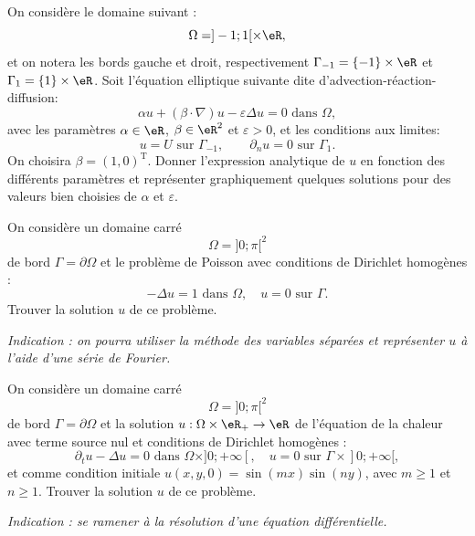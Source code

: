 
\newpage

\begin{exercice}\label{exoChEDP_AdvectionReactionDiffusion}

On considère le domaine suivant :
\[
\Omega = ]-1;1[ \times \eR,
\]
et on notera les bords gauche et droit, respectivement $\Gamma_{-1} = \{ -1 \} \times \eR$ et $\Gamma_1 = \{ 1 \} \times \eR$.
Soit l'équation elliptique suivante dite d'advection-réaction-diffusion:
\[
\alpha u + ( \beta \cdot \nabla ) u - \varepsilon \Delta u = 0 \mbox{ dans } \Omega,
\]
avec les paramètres $\alpha \in \eR$, $\beta \in \eR^2$ et $\varepsilon > 0$,
et les conditions aux limites:
\[
u = U \mbox{ sur } \Gamma_{-1}, \qquad \partial_n u = 0 \mbox{ sur } \Gamma_1.
\]
On choisira $\beta = (1,0)^\mathrm{T}$. Donner l'expression analytique de $u$ en fonction des différents paramètres et représenter graphiquement quelques solutions pour des valeurs bien choisies de $\alpha$ et $\varepsilon$.

\end{exercice}

\medskip

\begin{exercice}\label{exoChEDP_PoissonCarre}

On considère un domaine carré 
$$ \Omega = ] 0 ; \pi [^2$$
de bord $\Gamma = \partial \Omega$
et le problème de Poisson avec conditions de Dirichlet homogènes :
\[
- \Delta u = 1 \mbox{ dans } \Omega, \quad u = 0 \mbox{ sur } \Gamma.
\]
Trouver la solution $u$ de ce problème.

\medskip

{\it Indication : on pourra utiliser la méthode des variables séparées et représenter $u$ à l'aide d'une série de Fourier.}

\end{exercice}

\medskip

\begin{exercice}\label{exoChEDP_ChaleurAnalytique}

On considère un domaine carré 
$$ \Omega = ] 0 ; \pi [^2$$
de bord $\Gamma = \partial \Omega$
et la solution $u : \Omega \times \eR_+ \rightarrow \eR$ de l'équation de la chaleur avec terme source nul et conditions de Dirichlet homogènes :
\[
\partial_t u - \Delta u = 0 \mbox{ dans } \Omega \times ]0;+\infty[, \quad u = 0 \mbox{ sur } \Gamma \times ]0;+\infty[,
\]
et comme condition initiale $u(x,y,0) = \sin(m x) \sin(n y)$, avec $m \geq1$ et $n\geq1$.
Trouver la solution $u$ de ce problème.

\medskip

{\it Indication : se ramener à la résolution d'une équation différentielle.}

\end{exercice}

